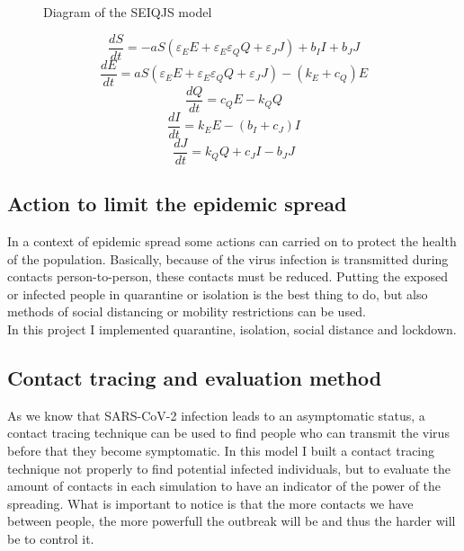 \documentclass[12pt]{llncs}
\begin{document}
\begin{figure}[H]
	\centering
    \caption{Diagram of the SEIQJS model}
\end{figure}

$$\frac{dS}{dt} = -aS(\varepsilon_EE + \varepsilon_E\varepsilon_QQ + \varepsilon_JJ) + b_II + b_JJ$$
$$\frac{dE}{dt} = aS(\varepsilon_EE + \varepsilon_E\varepsilon_QQ + \varepsilon_JJ) - (k_E + c_Q)E$$
$$\frac{dQ}{dt} = c_QE - k_QQ$$
$$\frac{dI}{dt} = k_EE - (b_I + c_J)I$$
$$\frac{dJ}{dt} = k_QQ + c_JI - b_JJ$$

\subsection{Action to limit the epidemic spread}
In a context of epidemic spread some actions can carried on to protect the health of the population. Basically, because of the virus infection is transmitted during contacts person-to-person, these contacts must be reduced. Putting the exposed or infected people in quarantine or isolation is the best thing to do, but also methods of social distancing or mobility restrictions can be used. \\
In this project I implemented quarantine, isolation, social distance and lockdown.

\subsection{Contact tracing and evaluation method}
As we know that SARS-CoV-2 infection leads to an asymptomatic status, a contact tracing technique can be used to find people who can transmit the virus before that they become symptomatic. In this model I built a contact tracing technique not properly to find potential infected individuals, but to evaluate the amount of contacts in each simulation to have an indicator of the power of the spreading. What is important to notice is that the more contacts we have between people, the more powerfull the outbreak will be and thus the harder will be to control it.
\end{document}
